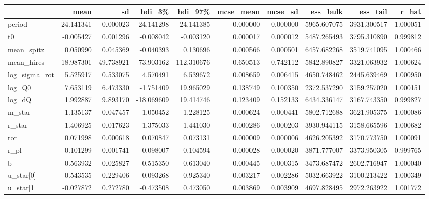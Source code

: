 \begin{tabular}{lrrrrrrrrr}
\toprule
{} &       mean &         sd &     hdi\_3\% &     hdi\_97\% &  mcse\_mean &   mcse\_sd &     ess\_bulk &     ess\_tail &     r\_hat \\
\midrule
period        &  24.141341 &   0.000023 &  24.141298 &   24.141385 &   0.000000 &  0.000000 &  5965.607075 &  3931.300517 &  1.000051 \\
t0            &  -0.005427 &   0.001296 &  -0.008042 &   -0.003120 &   0.000017 &  0.000012 &  5487.265493 &  3795.310890 &  0.999812 \\
mean\_spitz    &   0.050990 &   0.045369 &  -0.040393 &    0.130696 &   0.000566 &  0.000501 &  6457.682268 &  3519.741095 &  1.000466 \\
mean\_hires    &  18.987301 &  49.738921 & -73.903162 &  112.310676 &   0.650513 &  0.742112 &  5842.890827 &  3321.063932 &  1.000624 \\
log\_sigma\_rot &   5.525917 &   0.533075 &   4.570491 &    6.539672 &   0.008659 &  0.006415 &  4650.748462 &  2445.639469 &  1.000950 \\
log\_Q0        &   7.653119 &   6.473330 &  -1.751409 &   19.965029 &   0.138749 &  0.100350 &  2372.537290 &  3159.257020 &  1.000151 \\
log\_dQ        &   1.992887 &   9.893170 & -18.069609 &   19.414746 &   0.123409 &  0.152133 &  6434.336147 &  3167.743350 &  0.999827 \\
m\_star        &   1.135137 &   0.047457 &   1.050452 &    1.228125 &   0.000624 &  0.000441 &  5802.712688 &  3621.905375 &  1.000086 \\
r\_star        &   1.406925 &   0.017623 &   1.375033 &    1.441030 &   0.000286 &  0.000203 &  3930.944115 &  3158.665596 &  1.000682 \\
ror           &   0.071998 &   0.000618 &   0.070847 &    0.073131 &   0.000009 &  0.000006 &  4626.205392 &  3170.773750 &  1.000091 \\
r\_pl          &   0.101299 &   0.001741 &   0.098007 &    0.104594 &   0.000028 &  0.000020 &  3871.777007 &  3373.950305 &  0.999765 \\
b             &   0.563932 &   0.025827 &   0.515350 &    0.613040 &   0.000445 &  0.000315 &  3473.687472 &  2602.716947 &  1.000040 \\
u\_star[0]     &   0.543535 &   0.229406 &   0.093268 &    0.925340 &   0.003217 &  0.002286 &  5032.663922 &  3100.213422 &  1.000349 \\
u\_star[1]     &  -0.027872 &   0.272780 &  -0.473508 &    0.473050 &   0.003869 &  0.003909 &  4697.828495 &  2972.263922 &  1.001772 \\

\end{tabular}
